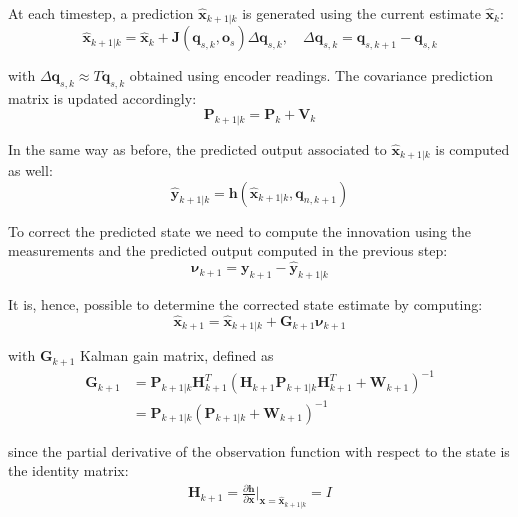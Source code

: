 \documentclass[a4paper]{article}
\newcommand{\at}[2][]{#1|_{#2}}
\begin{document}

At each timestep, a prediction $\bm{\hat{x}}_{k+1|k}$ is
generated using the current estimate $\bm{\hat{x}}_{k}$:
\begin{equation}
    \bm{\hat{x}}_{k+1|k} = \bm{\hat{x}}_k + \bm{J}(\bm{q}_{s,k}, \bm{o}_s) \Delta \bm{q}_{s,k},
    \quad \Delta \bm{q}_{s,k} = \bm{q}_{s,k+1} - \bm{q}_{s,k}
\end{equation}

\noindent with $\Delta \bm{q}_{s,k} \approx T \bm{\dot{q}}_{s,k}$
obtained using encoder readings. The covariance prediction
matrix is updated accordingly:
\begin{equation}
    \bm{P}_{k+1|k} = \bm{P}_{k} + \bm{V}_{k}
\end{equation}

In the same way as before, the predicted output
associated to $\bm{\hat{x}}_{k+1|k}$ is computed as well:
\begin{equation}
    \bm{\hat{y}}_{k+1|k} = \bm{h}(\bm{\hat{x}}_{k+1|k}, \bm{q}_{n, k+1})
\end{equation}

To correct the predicted state we need to compute the
innovation using the measurements and the predicted
output computed in the previous step:
\begin{equation}
    \bm{\nu}_{k+1} = \bm{y}_{k+1} - \bm{\hat{y}}_{k+1|k}
\end{equation}

It is, hence, possible to determine the corrected state
estimate by computing:
\begin{equation}
    \bm{\hat{x}}_{k+1} = \bm{\hat{x}}_{k+1|k} + \bm{G}_{k+1} \bm{\nu}_{k+1}
\end{equation}

\noindent with $\bm{G}_{k+1}$ Kalman gain matrix, defined as
\begin{align}
    \bm{G}_{k+1} &= \bm{P}_{k+1|k} \bm{H}_{k+1}^T \left( \bm{H}_{k+1} \bm{P}_{k+1|k} \bm{H}_{k+1}^T + \bm{W}_{k+1} \right)^{-1} \\
        &= \bm{P}_{k+1|k} (\bm{P}_{k+1|k} + \bm{W}_{k+1})^{-1}
\end{align}

\noindent since the partial derivative of the observation
function with respect to the state is the identity matrix:
\begin{align}
    \bm{H}_{k+1} = \frac{\partial \bm{h}}{\partial \bm{x}} \at[\bigg]{\bm{x}=\bm{\hat{x}}_{k+1|k}} 
        = I
\end{align}
\end{document}
